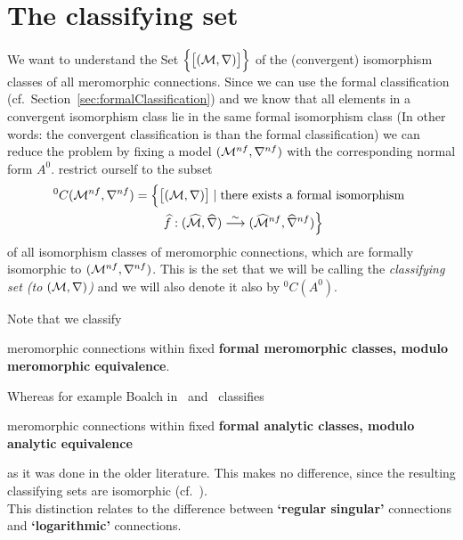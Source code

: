 \section{The classifying set}\label{sec:classifyingSet}
We want to understand the Set
$\Big\{\big[(\mathcal{M},\nabla)\big]\Big\}$ of the (convergent)
isomorphism classes of all meromorphic connections. Since we can use the formal
classification (cf.\ Section~\ref{sec:formalClassification}) and we know that
all elements in a convergent isomorphism class lie in the same formal
isomorphism class (In other words: the convergent classification is
 than the formal classification) we can reduce the problem by
fixing a model $(\mathcal{M}^{nf},\nabla^{nf})$ with the corresponding normal form
$A^0$.
 restrict ourself to the subset
\begin{multline*}
  {}^0C(\mathcal{M}^{nf},\nabla^{nf})=\Big\{
    \big[(\mathcal{M},\nabla)\big]
    \mid \text{there exists a formal isomorphism }
  \\\qquad\widehat f:(\widehat{\mathcal{M}},\widehat\nabla)
      \overset{\sim}\longrightarrow
      (\widehat{\mathcal{M}}^{nf},\widehat\nabla^{nf})
  \Big\}
\end{multline*}
of all isomorphism classes of meromorphic connections, which are formally
isomorphic to $(\mathcal{M}^{nf},\nabla^{nf})$. This is the set that we will be
calling the \emph{classifying set (to $(\mathcal{M},\nabla)$)} and we will also denote
it also by ${}^0C(A^0)$.
\begin{rem}
  Note that we classify
  \begin{einr}
    meromorphic connections within fixed \textbf{formal meromorphic classes,
    modulo meromorphic equivalence}.
  \end{einr}
  Whereas for example Boalch in~\cite{boalch} and~\cite{thboalch} classifies
  \begin{einr}
    meromorphic connections within fixed \textbf{formal analytic classes,
    modulo analytic equivalence}
  \end{einr}
  as it was done in the older literature.
  This makes no difference, since the resulting classifying sets are isomorphic
  (cf.~\cite{thboalch}).
  \\This distinction relates to the difference between \textbf{‘regular
  singular’} connections and \textbf{‘logarithmic’} connections.
\end{rem}
